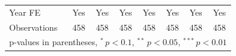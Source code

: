 \begin{table}[htbp]
\begin{tabular*}{\hsize}{@{\hskip\tabcolsep\extracolsep\fill}l*{7}{c}}
\midrule
\addlinespace Year FE&         Yes         &         Yes         &         Yes         &         Yes         &         Yes         &         Yes         &         Yes         \\
\addlinespace \midrule \addlinespace Observations&         458         &         458         &         458         &         458         &         458         &         458         &         458         \\
\bottomrule
\multicolumn{8}{l}{\footnotesize p-values in parentheses, $^{*}\, p<0.1$, $^{**}\, p<0.05$, $^{***}\, p<0.01$}\\
\end{tabular*}
\end{table}
